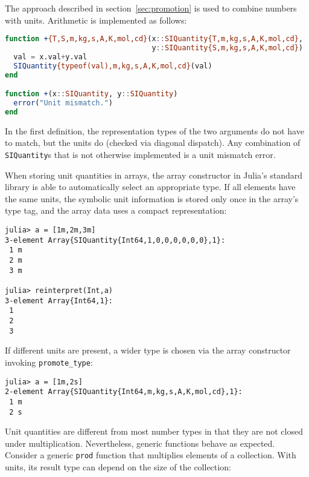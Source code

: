 \noindent
The approach described in section~\ref{sec:promotion} is used to combine
numbers with units.
Arithmetic is implemented as follows:

\begin{singlespace}
\begin{lstlisting}[language=julia]
function +{T,S,m,kg,s,A,K,mol,cd}(x::SIQuantity{T,m,kg,s,A,K,mol,cd},
                                  y::SIQuantity{S,m,kg,s,A,K,mol,cd})
  val = x.val+y.val
  SIQuantity{typeof(val),m,kg,s,A,K,mol,cd}(val)
end

function +(x::SIQuantity, y::SIQuantity)
  error("Unit mismatch.")
end
\end{lstlisting}
\end{singlespace}

\noindent
In the first definition, the representation types of the two
arguments do not have to match, but the units do (checked via diagonal
dispatch).
Any combination of \texttt{SIQuantity}s that is not otherwise implemented
is a unit mismatch error.

When storing unit quantities in arrays, the array constructor in Julia's
standard library is able to automatically select an appropriate type.
If all elements have the same units, the symbolic unit information is
stored only once in the array's type tag, and the array data uses a
compact representation:

\begin{singlespace}
\begin{verbatim}
julia> a = [1m,2m,3m]
3-element Array{SIQuantity{Int64,1,0,0,0,0,0,0},1}:
 1 m
 2 m
 3 m

julia> reinterpret(Int,a)
3-element Array{Int64,1}:
 1
 2
 3
\end{verbatim}
\end{singlespace}

\noindent
If different units are present, a wider type is chosen via the array
constructor invoking \texttt{promote\_type}:

\begin{singlespace}
\begin{verbatim}
julia> a = [1m,2s]
2-element Array{SIQuantity{Int64,m,kg,s,A,K,mol,cd},1}:
 1 m
 2 s
\end{verbatim}
\end{singlespace}

Unit quantities are different from most number types in that they are not
closed under multiplication.
Nevertheless, generic functions behave as expected.
Consider a generic \texttt{prod} function that multiplies elements of a
collection.
With units, its result type can depend on the size of the collection:

